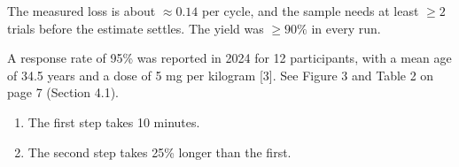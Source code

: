 \documentclass[11pt]{article}
\begin{document}
The measured loss is about $\approx 0.14$ per cycle, and the sample needs at least
$\geq 2$ trials before the estimate settles. The yield was $\geq 90\%$ in every run.

A response rate of 95\% was reported in 2024 for 12 participants, with a mean age of 34.5 years
and a dose of 5 mg per kilogram [3]. See Figure 3 and Table 2 on page 7 (Section 4.1).

\begin{enumerate}
\item The first step takes 10 minutes.
\item The second step takes 25\% longer than the first.
\end{enumerate}
\end{document}
